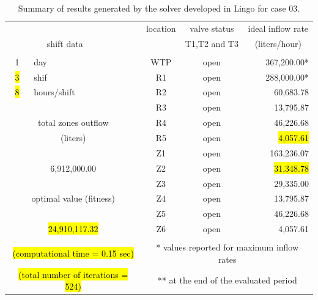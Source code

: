 \documentclass{singlecol}
\theoremstyle{TH}{
\newtheorem{lemma}{Lemma}
\newtheorem{theorem}[lemma]{Theorem}
\newtheorem{corrolary}[lemma]{Corrolary}
\newtheorem{conjecture}[lemma]{Conjecture}
\newtheorem{proposition}[lemma]{Proposition}
\newtheorem{claim}[lemma]{Claim}
\newtheorem{stheorem}[lemma]{Wrong Theorem}
\newtheorem{algorithm}{Algorithm}
}
\theoremstyle{THrm}{
\newtheorem{definition}{Definition}[section]
\newtheorem{question}{Question}[section]
\newtheorem{remark}{Remark}
\newtheorem{scheme}{Scheme}
}
\theoremstyle{THhit}{
\newtheorem{case}{Case}[section]
}
\begin{document}
\begin{table}[h!]
\begin{center}
\begin{small}
\begin{tabular}{ c r r r r r }
		   \\
		&  &      &  \multicolumn{1}{c}{location}    & \multicolumn{1}{c}{valve status} & \multicolumn{1}{c}{ideal inflow rate}   \\
		\multicolumn{2}{c}{shift data}     &   &      & \multicolumn{1}{c}{T1,T2 and T3} & \multicolumn{1}{c}{(liters/hour)} \\
		   \\
		1   &  \multicolumn{1}{l}{day}   &              	& \multicolumn{1}{c}{WTP} & \multicolumn{1}{c}{open} &  367,200.00* \\
		\hl{3}   &  \multicolumn{1}{l}{shif}  &         			& \multicolumn{1}{c}{R1}  & \multicolumn{1}{c}{open} &  288,000.00* \\
		\hl{8}  &  \multicolumn{1}{l}{hours/shift}        &     & \multicolumn{1}{c}{R2}  & \multicolumn{1}{c}{open} &   60,683.78  \\
	   &      &              								& \multicolumn{1}{c}{R3}  & \multicolumn{1}{c}{open} &   13,795.87  \\
	   \multicolumn{3}{c}{total zones outflow}              & \multicolumn{1}{c}{R4}  & \multicolumn{1}{c}{open} &   46,226.68  \\
	   \multicolumn{3}{c}{(liters)}              		    & \multicolumn{1}{c}{R5}  & \multicolumn{1}{c}{open} &    \hl{4,057.61}  \\
	   &      &              								& \multicolumn{1}{c}{Z1}  & \multicolumn{1}{c}{open} &  163,236.07  \\
	   \multicolumn{3}{c}{6,912,000.00}              		& \multicolumn{1}{c}{Z2}  & \multicolumn{1}{c}{open} &   \hl{31,348.78}  \\
	      &              &              					& \multicolumn{1}{c}{Z3}  & \multicolumn{1}{c}{open} &   29,335.00  \\
	   \multicolumn{3}{c}{optimal value (fitness)}          & \multicolumn{1}{c}{Z4}  & \multicolumn{1}{c}{open} &   13,795.87  \\
	   &             &             						 	& \multicolumn{1}{c}{Z5}  & \multicolumn{1}{c}{open} &   46,226.68  \\
	   \multicolumn{3}{c}{\hl{24,910,117.32}}                     & \multicolumn{1}{c}{Z6}  & \multicolumn{1}{c}{open} &    4,057.61 \\
	   \\
	   \multicolumn{3}{c}{\hl{(computational time  = 0.15 sec)}}     & \multicolumn{3}{c}{* values reported for maximum inflow rates} \\
	   \multicolumn{3}{c}{\hl{(total number of iterations = 524)}}   & \multicolumn{3}{c}{** at the end of the evaluated period} 
	\end{tabular}
		\end{small}
\caption{Summary of results generated by the solver developed in Lingo for case 03.}
\label{tab:lingoEvalCase03}
\end{center}
\end{table}
\end{document}

